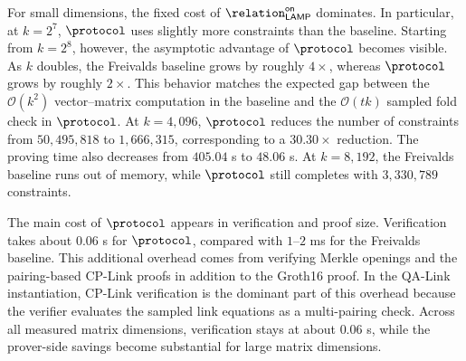 For small dimensions, the fixed cost of
\(\relation_{\mathsf{LAMP}}^{\mathsf{on}}\) dominates. In particular, at
\(k=2^7\), \(\protocol\) uses slightly more constraints than the baseline.
Starting from \(k=2^8\), however, the asymptotic advantage of \(\protocol\)
becomes visible. As \(k\) doubles, the Freivalds baseline grows by roughly
\(4\times\), whereas \(\protocol\) grows by roughly \(2\times\). This behavior
matches the expected gap between the \(\mathcal{O}(k^2)\) vector--matrix
computation in the baseline and the \(\mathcal{O}(tk)\) sampled fold check in
\(\protocol\).
At \(k=4{,}096\), \(\protocol\) reduces the number of constraints from
\(50{,}495{,}818\) to \(1{,}666{,}315\), corresponding to a \(30.30\times\)
reduction. The proving time also decreases from \(405.04\) s to \(48.06\) s.
At \(k=8{,}192\), the Freivalds baseline runs out of memory, while
\(\protocol\) still completes with \(3{,}330{,}789\) constraints.

The main cost of \(\protocol\) appears in verification and proof size.
Verification takes about \(0.06\) s for \(\protocol\), compared with
\(1\)--\(2\) ms for the Freivalds baseline. This additional overhead comes from
verifying Merkle openings and the pairing-based CP-Link proofs in addition to
the Groth16 proof. In the QA-Link instantiation, CP-Link verification is the
dominant part of this overhead because the verifier evaluates the sampled link
equations as a multi-pairing check. Across all measured matrix dimensions, verification stays at about \(0.06\) s, while the prover-side savings become substantial for large matrix dimensions.


